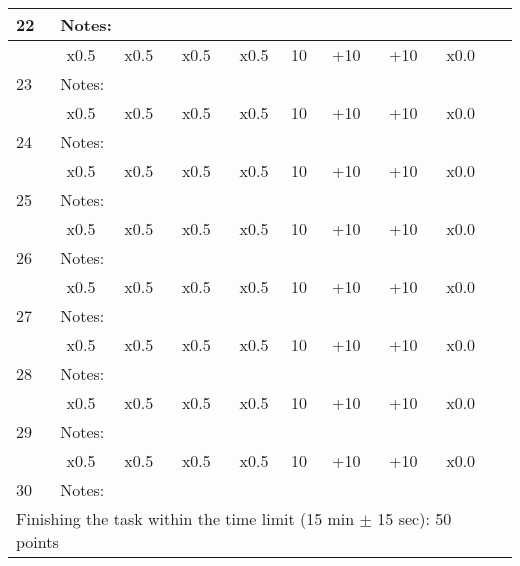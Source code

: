 \documentclass{article}
\begin{document}
\begin{center}
\begin{tabular}{|m{0.4cm}|m{0.8cm}|m{1cm}|m{1cm}|m{1.2cm}|m{0.8cm}|m{0.8cm}|m{1cm}|m{0.8cm}|m{0.8cm}|}
    \cline{2-9}
    22 & \multicolumn{8}{|l|}{Notes: }&\\
    \hline
     & \multicolumn{1}{|c|}{x0.5} & \multicolumn{1}{|c|}{x0.5} & \multicolumn{1}{|c|}{x0.5} & \multicolumn{1}{|c|}{x0.5}& 10& +10& +10& x0.0&\\
    \cline{2-9}
    23 & \multicolumn{8}{|l|}{Notes: }&\\
    \hline
     & \multicolumn{1}{|c|}{x0.5} & \multicolumn{1}{|c|}{x0.5} & \multicolumn{1}{|c|}{x0.5} & \multicolumn{1}{|c|}{x0.5}& 10& +10& +10& x0.0&\\
    \cline{2-9}
    24 & \multicolumn{8}{|l|}{Notes: }&\\
    \hline
     & \multicolumn{1}{|c|}{x0.5} & \multicolumn{1}{|c|}{x0.5} & \multicolumn{1}{|c|}{x0.5} & \multicolumn{1}{|c|}{x0.5}& 10& +10& +10& x0.0&\\
    \cline{2-9}
    25 & \multicolumn{8}{|l|}{Notes: }&\\
    \hline
     & \multicolumn{1}{|c|}{x0.5} & \multicolumn{1}{|c|}{x0.5} & \multicolumn{1}{|c|}{x0.5} & \multicolumn{1}{|c|}{x0.5}& 10& +10& +10& x0.0&\\
    \cline{2-9}
    26 & \multicolumn{8}{|l|}{Notes: }&\\
    \hline
     & \multicolumn{1}{|c|}{x0.5} & \multicolumn{1}{|c|}{x0.5} & \multicolumn{1}{|c|}{x0.5} & \multicolumn{1}{|c|}{x0.5}& 10& +10& +10& x0.0&\\
    \cline{2-9}
    27 & \multicolumn{8}{|l|}{Notes: }&\\
    \hline
     & \multicolumn{1}{|c|}{x0.5} & \multicolumn{1}{|c|}{x0.5} & \multicolumn{1}{|c|}{x0.5} & \multicolumn{1}{|c|}{x0.5}& 10& +10& +10& x0.0&\\
    \cline{2-9}
    28 & \multicolumn{8}{|l|}{Notes: }&\\
    \hline
     & \multicolumn{1}{|c|}{x0.5} & \multicolumn{1}{|c|}{x0.5} & \multicolumn{1}{|c|}{x0.5} & \multicolumn{1}{|c|}{x0.5}& 10& +10& +10& x0.0&\\
    \cline{2-9}
    29 & \multicolumn{8}{|l|}{Notes: }&\\
    \hline
     & \multicolumn{1}{|c|}{x0.5} & \multicolumn{1}{|c|}{x0.5} & \multicolumn{1}{|c|}{x0.5} & \multicolumn{1}{|c|}{x0.5}& 10& +10& +10& x0.0&\\
    \cline{2-9}
    30 & \multicolumn{8}{|l|}{Notes: }&\\
    \hline
    \multicolumn{9}{|l|}{Finishing the task within the time limit (15 min $\pm$ 15 sec): 50 points} & \\
    \hline

\end{tabular}
\end{center}
\end{document}
